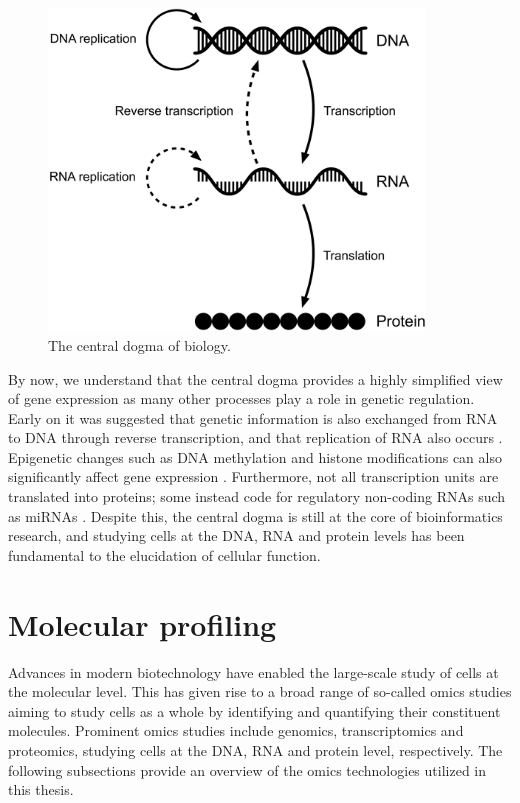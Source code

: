 \begin{figure}
    \centering
    \includegraphics[width=10cm]{figures/centraldogma.pdf}
    \caption{The central dogma of biology.}
    \label{fig:centraldogma}
\end{figure}

By now, we understand that the central dogma provides a highly simplified view of gene expression as many other processes play a role in genetic regulation. Early on it was suggested that genetic information is also exchanged from RNA to DNA through reverse transcription, and that replication of RNA also occurs \cite{Crick1970}. Epigenetic changes such as DNA methylation and histone modifications can also significantly affect gene expression \cite{Egger2004}. Furthermore, not all transcription units are translated into proteins; some instead code for regulatory non-coding RNAs such as miRNAs \cite{Robinson2009}. Despite this, the central dogma is still at the core of bioinformatics research, and studying cells at the DNA, RNA and protein levels has been fundamental to the elucidation of cellular function.

\section{Molecular profiling}
Advances in modern biotechnology have enabled the large-scale study of cells at the molecular level. This has given rise to a broad range of so-called omics studies aiming to study cells as a whole by identifying and quantifying their constituent molecules. Prominent omics studies include genomics, transcriptomics and proteomics, studying cells at the DNA, RNA and protein level, respectively. The following subsections provide an overview of the omics technologies utilized in this thesis.

